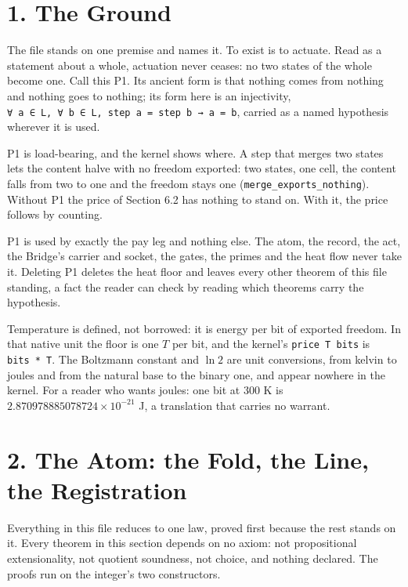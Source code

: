 \documentclass[10pt,twocolumn]{article}
\begin{document}
\hypertarget{the-ground}{%
\section{1. The Ground}\label{the-ground}}

The file stands on one premise and names it. To exist is to actuate.
Read as a statement about a whole, actuation never ceases: no two states
of the whole become one. Call this P1. Its ancient form is that nothing
comes from nothing and nothing goes to nothing; its form here is an
injectivity,
\texttt{∀\ a\ ∈\ L,\ ∀\ b\ ∈\ L,\ step\ a\ =\ step\ b\ →\ a\ =\ b},
carried as a named hypothesis wherever it is used.

P1 is load-bearing, and the kernel shows where. A step that merges two
states lets the content halve with no freedom exported: two states, one
cell, the content falls from two to one and the freedom stays one
(\texttt{merge\_\allowbreak{}exports\_\allowbreak{}nothing}). Without P1 the price of Section 6.2
has nothing to stand on. With it, the price follows by counting.

P1 is used by exactly the pay leg and nothing else. The atom, the
record, the act, the Bridge's carrier and socket, the gates, the primes
and the heat flow never take it. Deleting P1 deletes the heat floor and
leaves every other theorem of this file standing, a fact the reader can
check by reading which theorems carry the hypothesis.

Temperature is defined, not borrowed: it is energy per bit of exported
freedom. In that native unit the floor is one \(T\) per bit, and the
kernel's \texttt{price\ T\ bits} is \texttt{bits\ *\ T}. The Boltzmann
constant and \(\ln 2\) are unit conversions, from kelvin to joules and
from the natural base to the binary one, and appear nowhere in the
kernel. For a reader who wants joules: one bit at 300 K is
\(2.870978885078724\times10^{-21}\) J, a translation that carries no
warrant.

\hypertarget{the-atom-the-fold-the-line-the-registration}{%
\section{2. The Atom: the Fold, the Line, the
Registration}\label{the-atom-the-fold-the-line-the-registration}}

Everything in this file reduces to one law, proved first because the
rest stands on it. Every theorem in this section depends on no axiom:
not propositional extensionality, not quotient soundness, not choice,
and nothing declared. The proofs run on the integer's two constructors.
\end{document}
